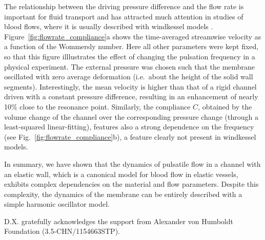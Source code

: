 \documentclass[aps,prl,reprint,superscriptaddress,floatfix]{revtex4-1}
\begin{document}
The relationship between the driving pressure difference and the flow rate is important for fluid transport and has attracted much attention in studies of blood flows, where it is usually described with windkessel models \citep{Westerhof2009}.  %
Figure~\ref{fig:flowrate_compliance}a shows the time-averaged streamwise velocity as a function of the Wommersly number. Here all other parameters were kept fixed, so that this figure illlustrates the effect of changing the pulsation frequency in a physical experiment. The external pressure was chosen such that the membrane oscillated with zero average deformation (i.e.\ about the height of the solid wall segments).  Interestingly, the mean velocity is higher than that of a rigid channel driven with a constant pressure difference, resulting in an enhancement of nearly 10\% close to the resonance point.
Similarly, the compliance $C$, obtained by the volume change of the channel over the corresponding pressure change (through a least-squared linear-fitting), features also a strong dependence on the frequency (see Fig.~\ref{fig:flowrate_compliance}b), a feature clearly not  present in windkessel models. %



In summary, we have shown that the dynamics of pulsatile flow in a channel with an elastic wall, which is a canonical model for blood flow in elastic vessels, exhibits complex dependencies on the material and flow parameters. Despite this complexity, the dynamics of the membrane can be entirely described with a simple harmonic oscillator model. 

\begin{acknowledgments}
D.X. gratefully acknowledges the support from Alexander von Humboldt Foundation (3.5-CHN/1154663STP).
\end{acknowledgments}


\end{document}
